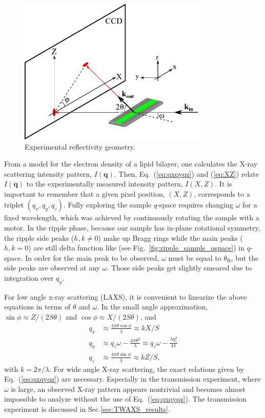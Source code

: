 \begin{figure}[htbp]
  \centering
  \includegraphics[width=0.8\textwidth]{figures/ripple/analysis/laxs_setup}
  \caption{Experimental reflectivity geometry.}
  \label{fig:laxs_setup}
\end{figure}

From a model for the electron density of a lipid bilayer, one calculates
the X-ray scattering intensity pattern, $I(\mathbf{q})$. Then, Eq.~(\ref{eq:qxqyqz})
and (\ref{eq:XZ}) relate $I(\mathbf{q})$ to the experimentally measured
intensity pattern, $I(X,Z)$. It is important to remember that a given pixel
position, $(X,Z)$, corresponds to a triplet $(q_x, q_y, q_z)$. Fully exploring 
the sample $q$-space requires changing $\omega$ for a fixed wavelength, which was
achieved by continuously rotating the sample with a motor. In the ripple phase, 
because our sample has in-plane rotational symmetry,
the ripple side peaks ($h,k\neq 0$) make up Bragg rings while the main peaks ($h,k=0$) are still 
delta function like (see Fig.~\ref{fig:ripple_sample_qspace}) in $q$-space. In order for the main peak to be
observed, $\omega$ must be equal to $\theta_\mathrm{B}$, but the side peaks
are observed at any $\omega$. Those side peaks get slightly smeared due to 
integration over $q_y$.

For low angle x-ray scattering (LAXS), it is convenient to linearize the above
equations in terms of $\theta$ and $\omega$. In the small angle approximation, 
$\sin\phi \approx Z/(2S\theta)$ and $\cos\phi \approx X/(2S\theta)$, and
\begin{align}
  q_x &\approx \frac{4\pi\theta\cos\phi}{\lambda} \approx kX/S \nonumber\\
  q_y &\approx q_z\omega -\frac{4\pi\theta^2}{\lambda} \approx q_z\omega - \frac{\lambda q_z^2}{4\pi}\nonumber\\
  q_z &\approx \frac{4\pi\theta\sin\phi}{\lambda} \approx kZ/S,
  \label{eq:qxqyqz_small}
\end{align}
with $k=2\pi/\lambda$. For wide angle X-ray scattering, the exact relations given
by Eq.~(\ref{eq:qxqyqz}) are necessary. Especially in the transmission experiment,
where $\omega$ is large, an observed X-ray pattern appears nontrivial and becomes
almost impossible to analyze without the use of Eq.~(\ref{eq:qxqyqz}).
The transmission experiment is discussed in Sec.\ref{sec:TWAXS_results}.

